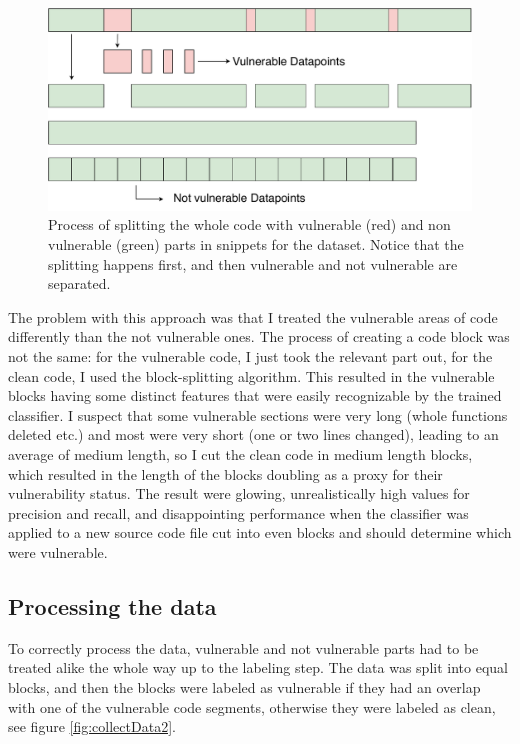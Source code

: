 \documentclass[
a4paper,
pagesize,
pdftex,
12pt,
twoside, %
BCOR=5mm, %
ngerman,
fleqn,
final,
]{scrartcl}
\begin{document}
	\begin{figure}[ht]
		\centering
		\includegraphics[width=0.8\linewidth]{img/collectData1}
		\caption{Process of splitting the whole code with vulnerable (red) and non vulnerable (green) parts in snippets for the dataset. Notice that the splitting happens first, and then vulnerable and not vulnerable are separated.}
		\label{fig:collectData1}
	\end{figure}
	
	The problem with this approach was that I treated the vulnerable areas of code differently than the not vulnerable ones. The process of creating a code block was not the same: for the vulnerable code, I just took the relevant part out, for the clean code, I used the block-splitting algorithm. This resulted in the vulnerable blocks having some distinct features that were easily recognizable by the trained classifier. I suspect that some vulnerable sections were very long (whole functions deleted etc.) and most were very short (one or two lines changed), leading to an average of medium length, so I cut the clean code in medium length blocks, which resulted in the length of the blocks doubling as a proxy for their vulnerability status. The result were glowing, unrealistically high values for precision and recall, and disappointing performance when the classifier was applied to a new source code file cut into even blocks and should determine which were vulnerable.\\
	
	\subsection{Processing the data}\label{Processing}
	To correctly process the data, vulnerable and not vulnerable parts had to be treated alike the whole way up to the labeling step. The data was split into equal blocks, and then the blocks were labeled as vulnerable if they had an overlap with one of the vulnerable code segments, otherwise they were labeled as clean, see figure \ref{fig:collectData2}.
	
\end{document}
